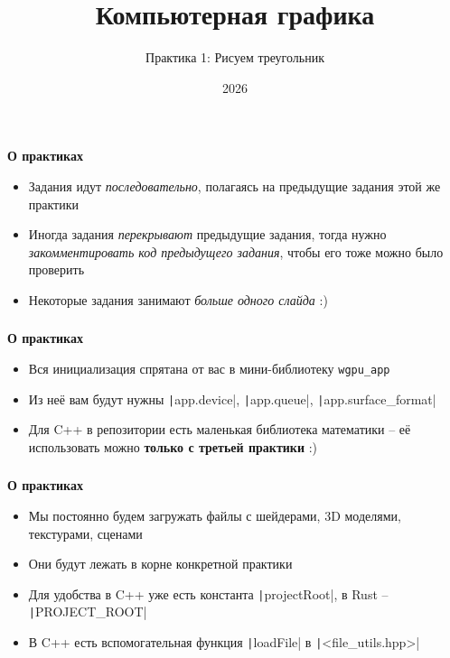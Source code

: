 \documentclass[10pt]{beamer}
\title{Компьютерная графика}
\subtitle{Практика 1: Рисуем треугольник}
\date{2026}
\begin{document}
\frame{\titlepage}

\begin{frame}[fragile]
\frametitle{}
\textbf{О практиках}
\begin{itemize}
\item Задания идут \textit{последовательно}, полагаясь на предыдущие задания этой же практики
\item Иногда задания \textit{перекрывают} предыдущие задания, тогда нужно \textit{закомментировать код предыдущего задания}, чтобы его тоже можно было проверить
\item Некоторые задания занимают \textit{больше одного слайда} :)
\end{itemize}
\end{frame}

\begin{frame}[fragile]
\frametitle{}
\textbf{О практиках}
\begin{itemize}
\item Вся инициализация спрятана от вас в мини-библиотеку \nolinkurl{wgpu_app}
\item Из неё вам будут нужны \texttt|app.device|, \texttt|app.queue|, \texttt|app.surface_format|
\item Для C++ в репозитории есть маленькая библиотека математики -- её использовать можно \textbf{только с третьей практики} :)
\end{itemize}
\end{frame}

\begin{frame}[fragile]
\frametitle{}
\textbf{О практиках}
\begin{itemize}
\item Мы постоянно будем загружать файлы с шейдерами, 3D моделями, текстурами, сценами
\item Они будут лежать в корне конкретной практики
\item Для удобства в C++ уже есть константа \texttt|projectRoot|, в Rust -- \texttt|PROJECT_ROOT|
\item В C++ есть вспомогательная функция \texttt|loadFile| в \texttt|<file_utils.hpp>|
\end{itemize}
\end{frame}
\end{document}
